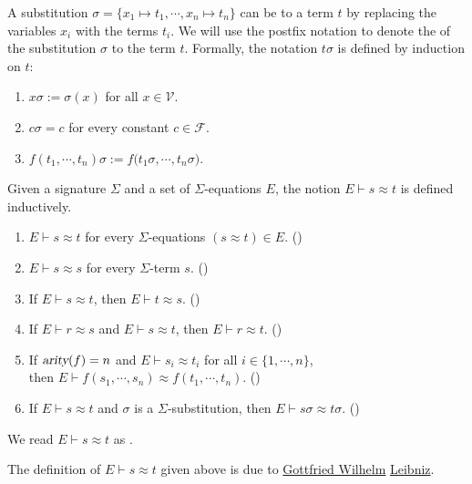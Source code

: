 A substitution $\sigma = \{ x_1 \mapsto t_1, \cdots, x_n \mapsto t_n \}$ can be  to a term $t$
by replacing the variables $x_i$ with the terms $t_i$.  We will use the postfix notation  to denote the
 of the substitution $\sigma$ to the term $t$.  Formally, the notation $t \sigma$ is defined
by induction on $t$:
\begin{enumerate}
\item $x \sigma := \sigma(x)$ \quad for all $x \in \mathcal{V}$.
\item $c \sigma = c$ \quad for every constant $c \in \mathcal{F}$.
\item $f(t_1, \cdots, t_n) \sigma := f\bigl(t_1\sigma, \cdots, t_n\sigma\bigr)$.
\end{enumerate}

\begin{Definition} \hspace*{\fill} \linebreak
  Given a signature $\Sigma$ and a set of $\Sigma$-equations $E$, the notion
  $E \vdash s \approx t$ is defined inductively.
  \begin{enumerate}
  \item $E \vdash s \approx t$ \quad for every $\Sigma$-equations $(s \approx t) \in E$. \hspace*{\fill} ()
  \item $E \vdash s \approx s$ \quad for every $\Sigma$-term $s$. \hspace*{\fill} ()
  \item If $E \vdash s \approx t$, then $E \vdash t \approx s$.  \hspace*{\fill} ()
  \item If $E \vdash r \approx s$ and $E \vdash s \approx t$, then $E \vdash r \approx t$.  
        \hspace*{\fill} ()
  \item If $\textsl{arity}(f) = n$ and $E \vdash s_i \approx t_i$ for all $i \in \{1,\cdots,n\}$, \\
        then $E \vdash f(s_1,\cdots,s_n) \approx f(t_1,\cdots,t_n)$.
        \hspace*{\fill} ()
  \item If $E \vdash s \approx t$ and $\sigma$ is a $\Sigma$-substitution, then $E \vdash s\sigma \approx
  t\sigma$. 
        \hspace*{\fill} ()
  \end{enumerate}
  We read $E \vdash s \approx t$ as .
  \eoxs
\end{Definition}
The definition of $E \vdash s \approx t$ given above is due to 
\href{https://en.wikipedia.org/wiki/Gottfried_Wilhelm_Leibniz}{Gottfried Wilhelm}
\href{https://leibniz.com/en/keks-original}{Leibniz}.

